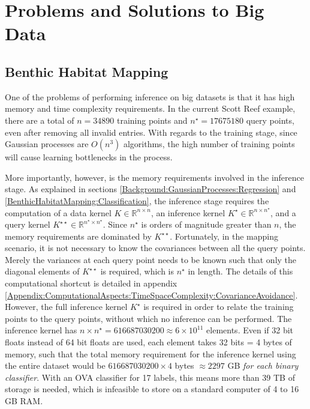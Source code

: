 \chapter{Problems and Solutions to Big Data}
\label{Appendix:BigData}

		\section{Benthic Habitat Mapping}
		\label{Appendix:BigData:BenthicHabitatMapping}
		
			One of the problems of performing inference on big datasets is that it has high memory and time complexity requirements. In the current Scott Reef example, there are a total of $n = 34890$ training points and $n^{\star} = 17675180$ query points, even after removing all invalid entries. With regards to the training stage, since Gaussian processes are $O(n^{3})$ algorithms, the high number of training points will cause learning bottlenecks in the process.
			
			More importantly, however, is the memory requirements involved in the inference stage. As explained in sections \ref{Background:GaussianProcesses:Regression} and \ref{BenthicHabitatMapping:Classification}, the inference stage requires the computation of a data kernel $K \in \mathbb{R}^{n \times n}$, an inference kernel $K^{\star} \in \mathbb{R}^{n \times n^{\star}}$, and a query kernel $K^{\star \star} \in \mathbb{R}^{n^{\star} \times n^{\star}}$. Since $n^{\star}$ is orders of magnitude greater than $n$, the memory requirements are dominated by $K^{\star \star}$. Fortunately, in the mapping scenario, it is not necessary to know the covariances between all the query points. Merely the variances at each query point needs to be known such that only the diagonal elements of $K^{\star \star}$ is required, which is $n^{\star}$ in length. The details of this computational shortcut is detailed in appendix \ref{Appendix:ComputationalAspects:TimeSpaceComplexity:CovarianceAvoidance}. However, the full inference kernel $K^{\star}$ is required in order to relate the training points to the query points, without which no inference can be performed. The inference kernel has $n \times n^{\star} = 616687030200 \approx 6 \times 10^{11}$ elements. Even if 32 bit floats instead of 64 bit floats are used, each element takes 32 bits = 4 bytes of memory, such that the total memory requirement for the inference kernel using the entire dataset would be $616687030200 \times 4$ bytes $\approx 2297$ GB \textit{for each binary classifier}. With an OVA classifier for 17 labels, this means more than 39 TB of storage is needed, which is infeasible to store on a standard computer of 4 to 16 GB RAM.
			
